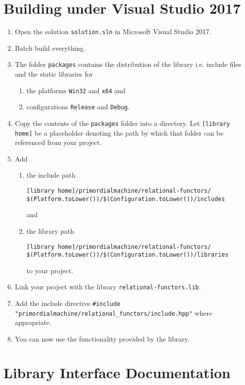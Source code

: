 \documentclass[oneside]{article}
\begin{document}
\section{Building under Visual Studio 2017}
\begin{enumerate}
\item Open the solution \texttt{solution.sln} in Microsoft Visual Studio 2017.
\item Batch build everything.
\item The folder \texttt{packages} contains the distribution of the library i.e. include files and the
      static libraries for
  \begin{enumerate}
    \item the platforms \texttt{Win32} and \texttt{x64} and
    \item configurations \texttt{Release} and \texttt{Debug}.
  \end{enumerate}
\item Copy the contents of the \verb+packages+ folder into a directory. Let
      \verb+[library home]+ be a placeholder denoting the path by which that folder
      can be referenced from your project.
\item Add
  \begin{enumerate}
    \item the include path
\begin{verbatim}
[library home]/primordialmachine/relational-functors/
$(Platform.toLower())/$(Configuration.toLower())/includes
\end{verbatim}
	and
    \item the library path
\begin{verbatim}
[library home]/primordialmachine/relational-functors/
$(Platform.toLower())/$(Configuration.toLower())/libraries
\end{verbatim}
    to your project.
\end{enumerate}
\item Link your project with the library \verb+relational-functors.lib+.
\item Add the include directive \verb+#include "primordialmachine/relational_functors/include.hpp"+ where appropriate.
\item You can now use the functionality provided by the library.
\end{enumerate}

\section{Library Interface Documentation}
\end{document}

